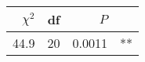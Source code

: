 
\begin{tabular}{rrrl}
\toprule
$\chi^2$ & df & $P$ & \\
\midrule
44.9 & 20 & 0.0011 & **\\
\bottomrule
\end{tabular}
